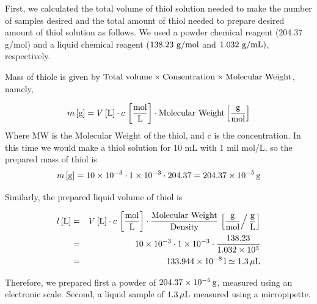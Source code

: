 First, we calculated the total volume of thiol solution needed to make the number of samples desired and the total amount of thiol needed to prepare desired amount of thiol solution as follows. We used a powder chemical reagent (204.37 g/mol) and a liquid chemical reagent ($138.23 \ {\rm g/mol}$ and $1.032 \ {\rm g/mL})$, respectively. 

Mass of thiole is given by 
$ {\rm Total\ volume \times Consentration \times Molecular \ Weight}$, namely,

\begin{equation}
 m\, [{\rm g}]=V \, [{\rm L}] \cdot c \, \left[ \frac{{{\rm mol}}}{\rm L}\right] \cdot 
\text{Molecular Weight} \left[ \frac{\rm g}{{\rm mol}}\right]
\end{equation}
Where MW is the Molecular Weight of the thiol, and c is the concentration.
In this time we would make a thiol solution for 10 mL with 1 mil mol/L, so the prepared mass of thiol is 
\begin{eqnarray}
m\, [{\rm g}]=10\times 10^{-3}\cdot 1\times 10^{-3} 
\cdot  204.37  \nonumber
=204.37 \times 10^{-5} \, {\rm g}
\end{eqnarray}

Similarly, the prepared liquid volume of thiol is

\begin{eqnarray}
 l\, [{\rm L}] &=& V \, [{\rm L}] \cdot c \, \left[ \frac{{{\rm mol}}}{\rm L}\right] \cdot 
\frac{\rm Molecular \ Weight}{\rm Density} \left.  \left[ \frac{\rm g}{{\rm mol} }\right/\frac{\rm g}{\rm L}\right] \nonumber \\
& =& 10\times 10^{-3}\cdot 1\times 10^{-3} \cdot  \frac{138.23}{1.032\times 10^{3}} \nonumber \\
&=& 133.944 \times 10^{-8} \, {\rm l} \simeq 1.3 \, \mu \rm L
\end{eqnarray}

Therefore, we prepared first a powder of $204.37 \times 10^{-5} \, \rm g$, measured using an electronic scale. Second, a liquid sample of $1.3 \, \mu  \rm L$ measured using a micropipette.



